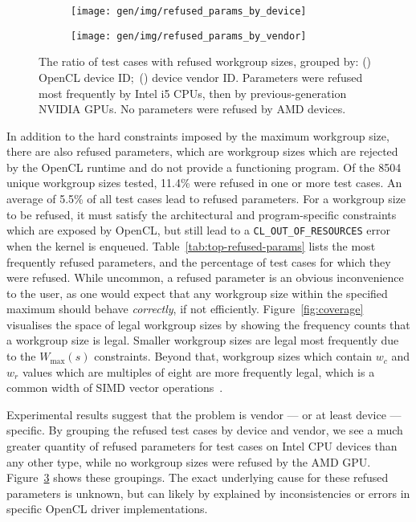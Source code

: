 \begin{figure}
\centering
\begin{subfigure}[h]{.45\textwidth}
  \centering
  \texttt{[image: gen/img/refused\_params\_by\_device]}
  \caption{}
  \label{fig:refused-params-by-device}
\end{subfigure}
\hfill
\begin{subfigure}[h]{.45\textwidth}
  \centering
  \texttt{[image: gen/img/refused\_params\_by\_vendor]}
  \caption{}
  \label{fig:refused-params-by-vendor}
\end{subfigure}
\caption[Refused workgroup sizes by device and vendor]{%
  The ratio of test cases with refused workgroup sizes, grouped by:
  () OpenCL device ID;\
  () device vendor ID. Parameters
  were refused most frequently by Intel i5 CPUs, then by
  previous-generation NVIDIA GPUs. No parameters were refused by AMD
  devices.%
}
\label{fig:refused-params-by-dev-vendor}
\end{figure}

In addition to the hard constraints imposed by the maximum workgroup
size, there are also refused parameters, which are workgroup sizes
which are rejected by the OpenCL runtime and do not provide a
functioning program. Of the 8504 unique workgroup sizes tested, 11.4\%
were refused in one or more test cases. An average of 5.5\% of all
test cases lead to refused parameters. For a workgroup size to be
refused, it must satisfy the architectural and program-specific
constraints which are exposed by OpenCL, but still lead to a
\texttt{CL\_OUT\_OF\_RESOURCES} error when the kernel is
enqueued. Table~\ref{tab:top-refused-params} lists the most frequently
refused parameters, and the percentage of test cases for which they
were refused. While uncommon, a refused parameter is an obvious
inconvenience to the user, as one would expect that any workgroup size
within the specified maximum should behave \emph{correctly}, if not
efficiently. Figure~\ref{fig:coverage} visualises the space of legal
workgroup sizes by showing the frequency counts that a workgroup size
is legal. Smaller workgroup sizes are legal most frequently due to the
$W_{\max}(s)$ constraints. Beyond that, workgroup sizes which contain
$w_c$ and $w_r$ values which are multiples of eight are more
frequently legal, which is a common width of SIMD vector
operations~\cite{IntelCorporation2012}.

Experimental results suggest that the problem is vendor --- or at
least device --- specific. By grouping the refused test cases by
device and vendor, we see a much greater quantity of refused
parameters for test cases on Intel CPU devices than any other type,
while no workgroup sizes were refused by the AMD
GPU. Figure~\ref{fig:refused-params-by-dev-vendor} shows these
groupings. The exact underlying cause for these refused parameters is
unknown, but can likely by explained by inconsistencies or errors in
specific OpenCL driver implementations.

